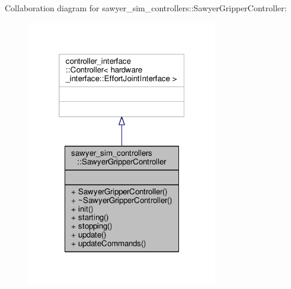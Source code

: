 Collaboration diagram for sawyer\-\_\-sim\-\_\-controllers\-:\-:Sawyer\-Gripper\-Controller\-:\nopagebreak
\begin{figure}[H]
\begin{center}
\leavevmode
\includegraphics[width=236pt]{classsawyer__sim__controllers_1_1_sawyer_gripper_controller__coll__graph}
\end{center}
\end{figure}
